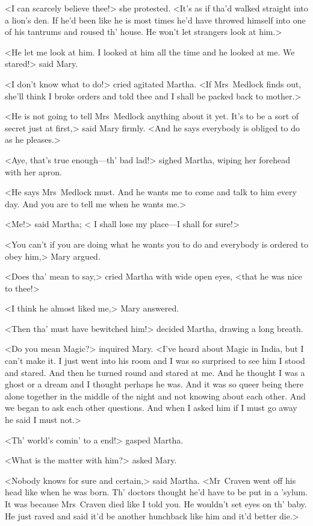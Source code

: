 <I can scarcely believe thee!> she protested. <It's as if tha'd walked straight into a lion's den. If he'd been like he is most times he'd have throwed himself into one of his tantrums and roused th' house. He won't let strangers look at him.>

<He let me look at him. I looked at him all the time and he looked at me. We stared!> said Mary.

<I don't know what to do!> cried agitated Martha. <If Mrs~Medlock finds out, she'll think I broke orders and told thee and I shall be packed back to mother.>

<He is not going to tell Mrs~Medlock anything about it yet. It's to be a sort of secret just at first,> said Mary firmly. <And he says everybody is obliged to do as he pleases.>

<Aye, that's true enough—th' bad lad!> sighed Martha, wiping her forehead with her apron.

<He says Mrs~Medlock must. And he wants me to come and talk to him every day. And you are to tell me when he wants me.>

<Me!> said Martha; < I shall lose my place—I shall for sure!>

<You can't if you are doing what he wants you to do and everybody is ordered to obey him,> Mary argued.

<Does tha' mean to say,> cried Martha with wide open eyes, <that he was nice to thee!>

<I think he almost liked me,> Mary answered.

<Then tha' must have bewitched him!> decided Martha, drawing a long breath.

<Do you mean Magic?> inquired Mary. <I've heard about Magic in India, but I can't make it. I just went into his room and I was so surprised to see him I stood and stared. And then he turned round and stared at me. And he thought I was a ghost or a dream and I thought perhaps he was. And it was so queer being there alone together in the middle of the night and not knowing about each other. And we began to ask each other questions. And when I asked him if I must go away he said I must not.>

<Th' world's comin' to a end!> gasped Martha.

<What is the matter with him?> asked Mary.

<Nobody knows for sure and certain,> said Martha. <Mr~Craven went off his head like when he was born. Th' doctors thought he'd have to be put in a 'sylum. It was because Mrs~Craven died like I told you. He wouldn't set eyes on th' baby. He just raved and said it'd be another hunchback like him and it'd better die.>

